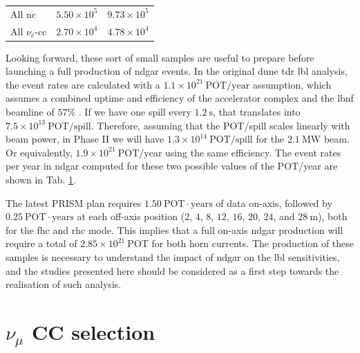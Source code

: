 \begin{table}[t]
\begin{center}
\begin{small}
\begin{tabular}{lcc}
            All \gls{nc}                            & $5.50 \times 10^{5}$                              & $9.73 \times 10^{5}$                              \\[2mm]
            All $\nu_{e}$-\gls{cc}                  & $2.70 \times 10^{4}$                              & $4.78 \times 10^{4}$                             
            \end{tabular}
		\end{small}
	\end{center}
	\label{tab:ndgar_event_rates}
\end{table}

Looking forward, these sort of small samples are useful to prepare before launching a full production of \gls{ndgar} events. In the original \gls{dune} \gls{tdr} \gls{lbl} analysis, the event rates are calculated with a $1.1 \times 10^{21} ~ \mathrm{POT}/\mathrm{year}$ assumption, which assumes a combined uptime and efficiency of the accelerator complex and the \gls{lbnf} beamline of $57\%$ \cite{DUNE2020}. If we have one spill every $1.2~\mathrm{s}$, that translates into $7.5 \times 10^{13} ~ \mathrm{POT}/\mathrm{spill}$. Therefore, assuming that the POT/spill scales linearly with beam power, in Phase II we will have $1.3 \times 10^{14} ~ \mathrm{POT}/\mathrm{spill}$ for the $2.1 ~ \mathrm{MW}$ beam. Or equivalently, $1.9 \times 10^{21} ~ \mathrm{POT}/\mathrm{year}$ using the same efficiency. The event rates per year in \gls{ndgar} computed for these two possible values of the POT/year are shown in Tab. \ref{tab:ndgar_event_rates}.

The latest PRISM plan requires $1.50 ~ \mathrm{POT} \cdot \mathrm{years}$ of data on-axis, followed by $0.25 ~ \mathrm{POT} \cdot \mathrm{years}$ at each off-axis position ($2$, $4$, $8$, $12$, $16$, $20$, $24$, and $28~\mathrm{m}$), both for the \gls{fhc} and \gls{rhc} mode. This implies that a full on-axis \gls{ndgar} production will require a total of $2.85 \times 10^{21}~\mathrm{POT}$ for both horn currents. The production of these samples is necessary to understand the impact of \gls{ndgar} on the \gls{lbl} sensitivities, and the studies presented here should be considered as a first step towards the realisation of such analysis.

\section[\texorpdfstring{$\nu_{\mu}$}{numu} CC selection]{\boldmath\texorpdfstring{$\nu_{\mu}$}{numu} CC selection}
\label{sec:gar_numu_cc}

